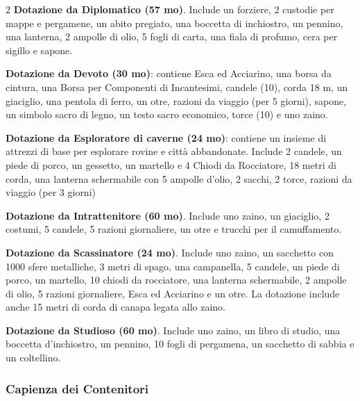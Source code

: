 \begin{multicols}{2}
\textbf{Dotazione da Diplomatico (57 mo)}. Include un forziere, 2 custodie per mappe e pergamene, un abito pregiato, una boccetta di inchiostro, un pennino, una lanterna, 2 ampolle di olio, 5 fogli di carta, una fiala di profumo, cera per sigillo e sapone.

\textbf{Dotazione da Devoto (30 mo)}: contiene Esca ed Acciarino, una borsa da cintura, una Borsa per Componenti di Incantesimi, candele (10), corda 18 m, un giaciglio, una pentola di ferro, un otre, razioni da viaggio (per 5 giorni), sapone, un simbolo sacro di legno, un testo sacro economico, torce (10) e uno zaino.


\textbf{Dotazione da Esploratore di caverne (24 mo)}: contiene un insieme di attrezzi di base per esplorare rovine e città abbandonate. Include 2 candele, un piede di porco, un gessetto, un martello e 4 Chiodi da Rocciatore, 18 metri di corda, una lanterna schermabile con 5 ampolle d'olio, 2 sacchi, 2 torce, razioni da viaggio (per 3 giorni)

\textbf{Dotazione da Intrattenitore (60 mo)}. Include uno zaino, un giaciglio, 2 costumi, 5 candele, 5 razioni giornaliere, un otre e trucchi per il camuffamento.

\textbf{Dotazione da Scassinatore (24 mo)}. Include uno zaino, un sacchetto con 1000 sfere metalliche, 3 metri di spago, una campanella, 5 candele, un piede di porco, un martello, 10 chiodi da rocciatore, una lanterna schermabile, 2 ampolle di olio, 5 razioni giornaliere, Esca ed Acciarino e un otre. La dotazione include anche 15 metri di corda di canapa legata allo zaino.

\textbf{Dotazione da Studioso (60 mo)}. Include uno zaino, un libro di studio, una boccetta d'inchiostro, un pennino, 10 fogli di pergamena, un sacchetto di sabbia e un coltellino.

\end{multicols}

\subsubsection{Capienza dei Contenitori}

